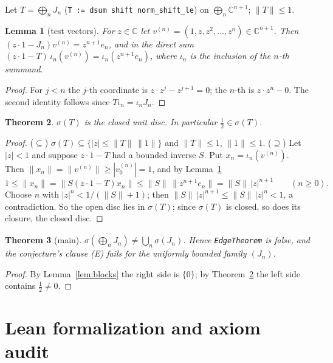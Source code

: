 \documentclass[11pt]{article}
\newtheorem{theorem}{Theorem}
\newtheorem{lemma}[theorem]{Lemma}
\theoremstyle{definition}
\begin{document}
Let $T=\bigoplus_n J_n$ (\texttt{T := dsum shift norm\_shift\_le}) on
$\bigoplus_n\mathbb{C}^{n+1}$; $\|T\|\le1$.

\begin{lemma}[test vectors]\label{lem:test}
For $z\in\mathbb{C}$ let $v^{(n)}=(1,z,z^2,\dots,z^n)\in\mathbb{C}^{n+1}$. Then
$(z\cdot1-J_n)v^{(n)}=z^{n+1}e_n$, and in the direct sum
$(z\cdot 1-T)\,\iota_n(v^{(n)})=\iota_n(z^{n+1}e_n)$, where $\iota_n$ is the inclusion of the
$n$-th summand.
\end{lemma}
\begin{proof}
For $j<n$ the $j$-th coordinate is $z\cdot z^j-z^{j+1}=0$; the $n$-th is $z\cdot z^n-0$. The second
identity follows since $T\iota_n=\iota_nJ_n$.
\end{proof}

\begin{theorem}\label{thm:disc}
$\sigma(T)$ is the closed unit disc. In particular $\tfrac12\in\sigma(T)$.
\end{theorem}
\begin{proof}
($\subseteq$) $\sigma(T)\subseteq\{|z|\le\|T\|\,\|1\|\}$ and $\|T\|\le1$, $\|1\|\le1$.
($\supseteq$) Let $|z|<1$ and suppose $z\cdot1-T$ had a bounded inverse $S$. Put
$x_n=\iota_n(v^{(n)})$. Then $\|x_n\|=\|v^{(n)}\|\ge|v^{(n)}_0|=1$, and by
Lemma~\ref{lem:test}
\[
 1\le\|x_n\|=\|S(z\cdot1-T)x_n\|\le\|S\|\,\|z^{n+1}e_n\|=\|S\|\,|z|^{n+1}\qquad(n\ge0).
\]
Choose $n$ with $|z|^n<1/(\|S\|+1)$; then $\|S\|\,|z|^{n+1}\le\|S\|\,|z|^n<1$, a contradiction.
So the open disc lies in $\sigma(T)$; since $\sigma(T)$ is closed, so does its closure, the closed
disc.
\end{proof}

\begin{theorem}[main]
$\overline{\sigma(\bigoplus_nJ_n)}\ne\overline{\bigcup_n\sigma(J_n)}$. Hence \texttt{EdgeTheorem}
is false, and the conjecture's clause (E) fails for the uniformly bounded family $(J_n)$.
\end{theorem}
\begin{proof}
By Lemma~\ref{lem:blocks} the right side is $\{0\}$; by Theorem~\ref{thm:disc} the left side
contains $\tfrac12\ne0$.
\end{proof}

\section{Lean formalization and axiom audit}
\end{document}
